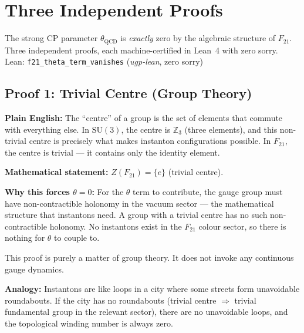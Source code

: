\documentclass[11pt,a4paper]{article}
\newcommand{\lean}[1]{\texttt{#1}}
\begin{document}
\section{Three Independent Proofs}

\begin{tcolorbox}[colback=boxorange,colframe=orange!60!black,title={Result: $\theta_{\mathrm{QCD}} = 0$ by Structure}]
The strong CP parameter $\theta_{\mathrm{QCD}}$ is \emph{exactly} zero by the algebraic structure of $F_{21}$.  Three independent proofs, each machine-certified in Lean~4 with zero sorry.\\[4pt]
Lean: \lean{f21\_theta\_term\_vanishes} (\textit{ugp-lean}, zero sorry)
\end{tcolorbox}

\subsection{Proof 1: Trivial Centre (Group Theory)}

\noindent\textbf{Plain English:}  The ``centre'' of a group is the set of elements that commute with everything else.  In $\mathrm{SU}(3)$, the centre is $\mathbb{Z}_3$ (three elements), and this non-trivial centre is precisely what makes instanton configurations possible.  In $F_{21}$, the centre is trivial --- it contains only the identity element.

\begin{tcolorbox}[colback=boxblue,colframe=blue!40!black,title=Proof 1: Trivial Centre]
\textbf{Mathematical statement:} $Z(F_{21}) = \{e\}$ (trivial centre).

\textbf{Why this forces $\theta = 0$:}  For the $\theta$ term to contribute, the gauge group must have non-contractible holonomy in the vacuum sector --- the mathematical structure that instantons need.  A group with a trivial centre has no such non-contractible holonomy.  No instantons exist in the $F_{21}$ colour sector, so there is nothing for $\theta$ to couple to.

This proof is purely a matter of group theory.  It does not invoke any continuous gauge dynamics.
\end{tcolorbox}

\medskip\noindent\textbf{Analogy:}  Instantons are like loops in a city where some streets form unavoidable roundabouts.  If the city has no roundabouts (trivial centre $\Rightarrow$ trivial fundamental group in the relevant sector), there are no unavoidable loops, and the topological winding number is always zero.
\end{document}

